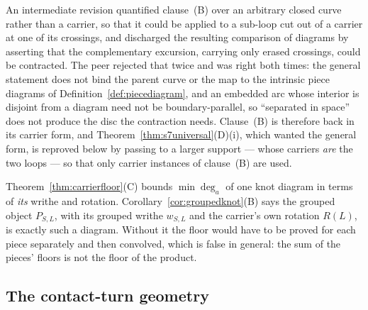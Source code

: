 \begin{remark}\label{rem:groupedgeneral}
An intermediate revision quantified clause~(B) over an arbitrary closed
curve rather than a carrier, so that it could be applied to a sub-loop cut out
of a carrier at one of its crossings, and discharged the resulting comparison
of diagrams by asserting that the complementary excursion, carrying only erased
crossings, could be contracted. The peer rejected that twice and was right
both times: the general statement does not bind the parent curve or the map to
the intrinsic piece diagrams of Definition~\ref{def:piecediagram}, and an
embedded arc whose interior is disjoint from a diagram need not be
boundary-parallel, so ``separated in space'' does not produce the disc the
contraction needs. Clause~(B) is therefore back in its carrier form, and
Theorem~\ref{thm:s7universal}(D)(i), which wanted the general form,
is reproved below by passing to a larger support --- whose carriers \emph{are}
the two loops --- so that only carrier instances of clause~(B) are used.
\end{remark}

\begin{remark}\label{rem:whygrouped}
Theorem~\ref{thm:carrierfloor}(C) bounds $\min\deg_a$ of one knot diagram in terms
of \emph{its} writhe and rotation. Corollary~\ref{cor:groupedknot}(B) says the
grouped object $P_{S,L}$, with its grouped writhe $w_{S,L}$ and the carrier's
own rotation $R(L)$, is exactly such a diagram. Without it the floor would have
to be proved for each piece separately and then convolved, which is false in
general: the sum of the pieces' floors is not the floor of the product.
\end{remark}

\subsection{The contact-turn geometry}

